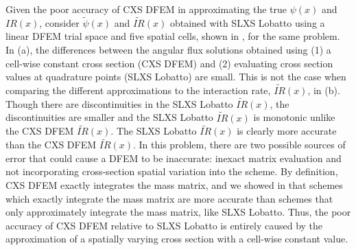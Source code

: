 Given the poor accuracy of CXS DFEM in approximating the true $\psi(x)$ and $IR(x)$, consider $\widetilde{\psi}(x)$ and $\widetilde{IR}(x)$ obtained with SLXS Lobatto using a linear DFEM trial space and five spatial cells, shown in , for the same problem.  
In (a), the differences between the angular flux solutions obtained using (1) a cell-wise constant cross section (CXS DFEM) and (2) evaluating cross section values at quadrature points (SLXS Lobatto) are small.
This is not the case when comparing the different approximations to the interaction rate, $\widetilde{IR}(x)$, in (b).  
Though there are discontinuities in the SLXS Lobatto $\widetilde{IR}(x)$, the discontinuities are smaller and the SLXS Lobatto $\widetilde{IR}(x)$ is monotonic unlike the CXS DFEM $\widetilde{IR}(x)$.   
The SLXS Lobatto $\widetilde{IR}(x)$ is clearly more accurate than the CXS DFEM $\widetilde{IR}(x)$.
%
%
In this problem, there are two possible sources of error that could cause a DFEM to be inaccurate: inexact matrix evaluation and not incorporating cross-section spatial variation into the scheme.
By definition, CXS DFEM exactly integrates the mass matrix, and we showed in \cite{part_1_paper} that schemes which exactly integrate the mass matrix are more accurate than schemes that only approximately integrate the mass matrix, like SLXS Lobatto.
Thus, the poor accuracy of CXS DFEM relative to SLXS Lobatto is entirely caused by the approximation of a spatially varying cross section with a cell-wise constant value.

